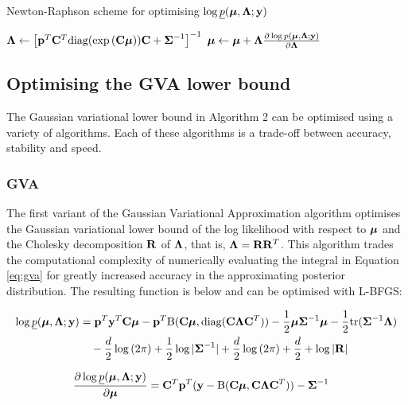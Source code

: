 \documentclass{article}[12pt]
\begin{document}
\begin{algorithm}\label{alg:algorithm_three}
\caption[Algorithm 3]{Newton-Raphson scheme for optimising $\log \underline{p}({\boldsymbol \mu}, {\boldsymbol \Lambda}; {\bf y})$}
\begin{algorithmic}
\STATE ${\boldsymbol \Lambda} \leftarrow \left [{\bf p}^T {\bf C}^T \text{diag}(\exp{({\bf C}{\boldsymbol\mu})}) {\bf C} + {\boldsymbol \Sigma}^{-1} \right ]^{-1}$
\STATE ${\boldsymbol \mu} \leftarrow {\boldsymbol\mu} + {\boldsymbol \Lambda} \frac{\partial \log p({\boldsymbol \mu}, {\boldsymbol \Lambda}; {\bf y})}{\partial {\boldsymbol\Lambda}}$
\ENDWHILE
\end{algorithmic}
\end{algorithm}

\subsection{Optimising the GVA lower bound}
The Gaussian variational lower bound in Algorithm 2 can be optimised using a 
variety of algorithms. Each of these algorithms is a trade-off between accuracy, 
stability and speed.

\subsubsection{GVA}
The first variant of the Gaussian Variational Approximation algorithm
optimises the Gaussian variational lower bound of the log likelihood with respect
to ${\boldsymbol \mu}$ and the Cholesky decomposition ${\bf R}$ of ${\boldsymbol \Lambda}$, that is,
${\boldsymbol \Lambda} = {\bf R} {\bf R}^T$. This algorithm trades the computational complexity of 
numerically evaluating the integral in Equation \ref{eq:gva} for greatly increased 
accuracy in the approximating posterior distribution. The resulting function is below and 
can be optimised with L-BFGS:

\begin{align}\label{eq:gva}
\log \underline{p}({\boldsymbol \mu}, {\boldsymbol \Lambda}; {\bf y}) &= {\bf p}^T{\bf y}^T{\bf C} {\boldsymbol \mu} - {\bf p}^T {\text{B}}({\bf C} {\boldsymbol \mu}, \text{diag}({\bf C} {\boldsymbol \Lambda} {\bf C}^T)) - {\frac{1}{2}} {\boldsymbol \mu} {\boldsymbol \Sigma}^{-1} {\boldsymbol \mu} - {\frac{1}{2}} \text{tr}{({\boldsymbol\Sigma}^{-1} {\boldsymbol\Lambda})} \\
&\quad - \frac{d}{2} \log{(2 \pi)} + {\frac{1}{2}} \log{|{\boldsymbol\Sigma}^{-1}|} + \frac{d}{2} \log{(2 \pi)} + \frac{d}{2} + \log{|{\bf R}|}
\end{align}

\begin{align*}
\frac{\partial \log \underline{p}({\boldsymbol \mu}, {\boldsymbol \Lambda}; {\bf y})}{\partial {\boldsymbol\mu}} &= {\bf C}^T {\bf p}^T({\bf y} - {\text{B}}({\bf C} {\boldsymbol \mu}, {\bf C} {\boldsymbol \Lambda} {\bf C}^T)) - {\boldsymbol \Sigma}^{-1}
\end{align*}
\end{document}
